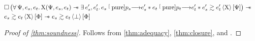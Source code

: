 \begin{lemma} \label{thm:closure}
    \begin{align*}
            &
            \iPersistent \left(
                \forall \iPredTwo, \datalangExpr_s, \datalangExpr_t \ldotp
                \iProt (\iPredTwo, \datalangExpr_s, \datalangExpr_t) \iWand
                \exists \datalangExpr_s', \datalangExpr_t' \ldotp
                \datalangExpr_s \pureStep{\datalangProg_s} \datalangExpr_s' \iSep
                \datalangExpr_t \pureStep{\datalangProg_t} \datalangExpr_t' \iSep
                \iSim[\iProt]{\iPredTwo}{\datalangExpr_s'}{\datalangExpr_t'}
            \right) \iWand
        \\
            &
            \iSim[\iProt]{\iPred}{\datalangExpr_s}{\datalangExpr_t} \iWand
            \iSim[\bot]{\iPred}{\datalangExpr_s}{\datalangExpr_t}
    \end{align*}
\end{lemma}

\begin{proof}[Proof of \cref{thm:soundness}]
    Follows from \cref{thm:adequacy}, \cref{thm:closure},  and .
\end{proof}


